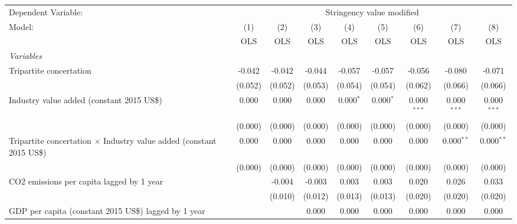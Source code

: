 
\begingroup
\centering
\begin{tabular}{lcccccccc}
   \toprule
   Dependent Variable: & \multicolumn{8}{c}{Stringency value modified}\\
   Model:                                                                       & (1)     & (2)     & (3)     & (4)         & (5)         & (6)           & (7)           & (8)\\  
                                                                                &  OLS    & OLS     & OLS     & OLS         & OLS         & OLS           & OLS           & OLS\\  
   \midrule
   \emph{Variables}\\
   Tripartite concertation                                                      & -0.042  & -0.042  & -0.044  & -0.057      & -0.057      & -0.056        & -0.080        & -0.071\\   
                                                                                & (0.052) & (0.052) & (0.053) & (0.054)     & (0.054)     & (0.062)       & (0.066)       & (0.066)\\   
   Industry value added (constant 2015 US\$)                                    & 0.000   & 0.000   & 0.000   & 0.000$^{*}$ & 0.000$^{*}$ & 0.000$^{***}$ & 0.000$^{***}$ & 0.000$^{***}$\\   
                                                                                & (0.000) & (0.000) & (0.000) & (0.000)     & (0.000)     & (0.000)       & (0.000)       & (0.000)\\   
   Tripartite concertation $\times$ Industry value added (constant 2015 US\$)   & 0.000   & 0.000   & 0.000   & 0.000       & 0.000       & 0.000         & 0.000$^{**}$  & 0.000$^{**}$\\   
                                                                                & (0.000) & (0.000) & (0.000) & (0.000)     & (0.000)     & (0.000)       & (0.000)       & (0.000)\\   
   CO2 emissions per capita lagged by 1 year                                    &         & -0.004  & -0.003  & 0.003       & 0.003       & 0.020         & 0.026         & 0.033\\   
                                                                                &         & (0.010) & (0.012) & (0.013)     & (0.013)     & (0.020)       & (0.020)       & (0.020)\\   
   GDP per capita (constant 2015 US\$) lagged by 1 year                         &         &         & 0.000   & 0.000       & 0.000       & 0.000         & 0.000         & 0.000\\   

\end{tabular}
